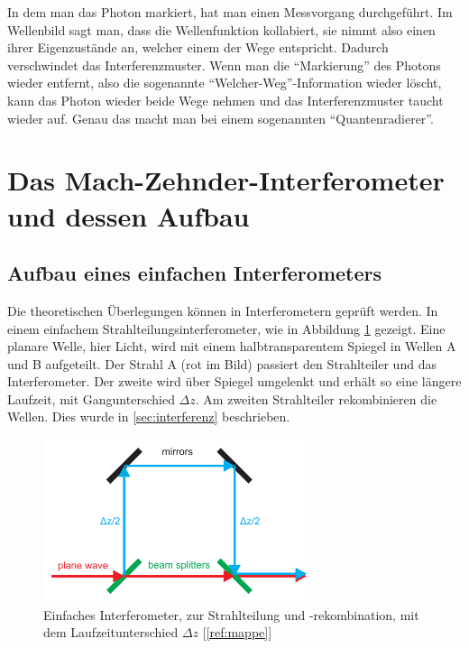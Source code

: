 \documentclass[a4paper,ngerman]{scrartcl}
\begin{document}
In dem man das Photon markiert, hat man einen Messvorgang durchgeführt. Im Wellenbild sagt man, dass die Wellenfunktion kollabiert, sie nimmt also einen ihrer Eigenzustände an, welcher einem der Wege entspricht. Dadurch verschwindet das Interferenzmuster. Wenn man die "`Markierung"' des Photons wieder entfernt, also die sogenannte "`Welcher-Weg"'-Information wieder löscht, kann das Photon wieder beide Wege nehmen und das Interferenzmuster taucht wieder auf. Genau das macht man bei einem sogenannten "`Quantenradierer"'.

\clearpage
\section{Das Mach-Zehnder-Interferometer und dessen Aufbau}
\label{sec:mach-zehnder}

\subsection{Aufbau eines einfachen Interferometers}
\label{ssec:interferomter-einfach}

Die theoretischen Überlegungen können in Interferometern geprüft werden. 
In einem einfachem Strahlteilungsinterferometer, wie in Abbildung \ref{fig: Interferometer-einfach} gezeigt. 
Eine planare Welle, hier Licht, wird mit einem halbtransparentem Spiegel in Wellen A und B aufgeteilt. Der Strahl A (rot im Bild) passiert den Strahlteiler und das Interferometer. 
Der zweite wird über Spiegel umgelenkt und erhält so eine längere Laufzeit, mit Gangunterschied $\Delta z$. 
Am zweiten Strahlteiler rekombinieren die Wellen. Dies wurde in \ref{sec:interferenz} beschrieben.

\begin{figure}
\includegraphics[width=0.7\textwidth]{interferomter-einfach.png}
\caption{Einfaches Interferometer, zur Strahlteilung und -rekombination, mit dem Laufzeitunterschied $\Delta z$ [\ref{ref:mappe}]}
\label{fig: Interferometer-einfach}
\end{figure}
\end{document}
